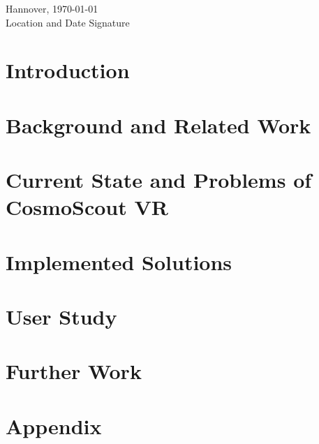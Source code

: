 \documentclass[11pt,DIV=12,BCOR=0mm,twoside,openright,headings=normal,%
  numbers=noenddot,headsepline,headinclude]{scrreprt}
\begin{document}
    \vspace*{3\baselineskip}
    \noindent
    Hannover, \today\\
    Location and Date\hspace{5cm} Signature

    \tableofcontents

    \cleardoublepage

    \chapter{Introduction}\label{ch:introduction}
        
    \chapter{Background and Related Work}\label{ch:background-and-related-work}
        
        
        
    \chapter{Current State and Problems of CosmoScout VR}\label{ch:current-state-and-problems-of-cosmoscout}
        
    \chapter{Implemented Solutions}\label{ch:implemented-solutions}
        
        
        
    \chapter{User Study}\label{ch:user-study}
        
    \chapter{Further Work}\label{ch:further-work}
        

    \appendix
    \chapter{Appendix}\label{ch:appendix}
        

    \renewcommand{\btxfnamespaceshort}{\,}
    
    
\end{document}
